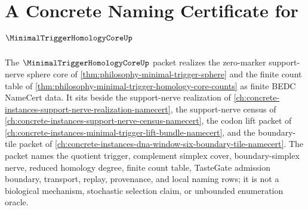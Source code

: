 \chapter{A Concrete Naming Certificate for $\MinimalTriggerHomologyCoreUp$}
\label{ch:concrete-instances-minimal-trigger-homology-core-namecert}

The $\MinimalTriggerHomologyCoreUp$ packet realizes the zero-marker support-nerve sphere core of \autoref{thm:philosophy-minimal-trigger-sphere} and the finite count table of \autoref{thm:philosophy-minimal-trigger-homology-core-counts} as finite BEDC NameCert data. It sits beside the support-nerve realization of \autoref{ch:concrete-instances-support-nerve-realization-namecert}, the support-nerve census of \autoref{ch:concrete-instances-support-nerve-census-namecert}, the codon lift packet of \autoref{ch:concrete-instances-minimal-trigger-lift-bundle-namecert}, and the boundary-tile packet of \autoref{ch:concrete-instances-dna-window-six-boundary-tile-namecert}. The packet names the quotient trigger, complement simplex cover, boundary-simplex nerve, reduced homology degree, finite count table, TasteGate admission boundary, transport, replay, provenance, and local naming rows; it is not a biological mechanism, stochastic selection claim, or unbounded enumeration oracle.

